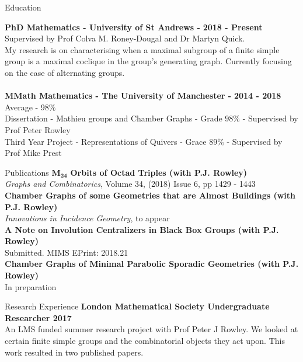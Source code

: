 \documentclass{resume} %
\begin{document}

\begin{rSection}{Education}

 \textbf{PhD Mathematics - University of St Andrews -} \textbf{2018 - Present} \\
Supervised by Prof Colva M. Roney-Dougal and Dr Martyn Quick.\\
My research is on characterising when a maximal subgroup of a finite simple group is a maximal coclique in the group's generating graph. Currently focusing on the case of alternating groups.\\
 \\
 \textbf{MMath Mathematics - The University of Manchester -} \textbf{2014 - 2018} \\
Average -  98$\%$\\
Dissertation - Mathieu groups and Chamber Graphs - Grade $98 \%$ - Supervised by Prof Peter Rowley\\
Third Year Project - Representations of Quivers - Grace $89 \%$ - Supervised by Prof Mike Prest
\end{rSection}
\vspace{0.3cm}
 \begin{rSection}{Publications}
$\mathbf{M_{24}}$\textbf{ Orbits of Octad Triples (with P.J. Rowley)}\\ \textit{Graphs and Combinatorics}, Volume 34, (2018) Issue 6, pp 1429 - 1443 \\
\textbf{Chamber Graphs of some Geometries that are Almost Buildings (with P.J. Rowley)} \\\textit{
Innovations in Incidence Geometry}, to appear\\
\textbf{A Note on Involution Centralizers in Black Box Groups (with P.J. Rowley)}\\ Submitted. MIMS EPrint: 2018.21 \\
\textbf{Chamber Graphs of Minimal Parabolic Sporadic Geometries (with P.J. Rowley)}\\ In preparation
\end{rSection}

\vspace{0.3cm}
\begin{rSection}{Research Experience}
\textbf{London Mathematical Society Undergraduate Researcher 2017} \\
An LMS funded summer research project with Prof Peter J Rowley. We looked at certain finite simple groups and the combinatorial objects they act upon. This work resulted in two published papers.
\end{rSection}
\end{document}
